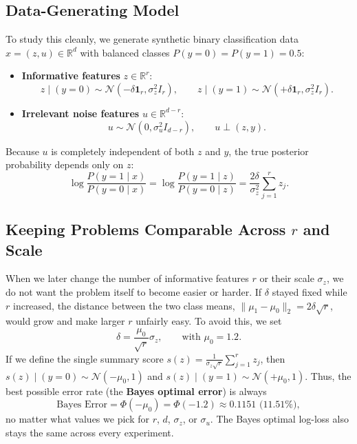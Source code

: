 \documentclass[11pt, a4paper]{article}
\begin{document}
\subsection{Data-Generating Model}
To study this cleanly, we generate synthetic binary classification data $x = (z, u) \in \mathbb{R}^d$ with balanced classes $P(y=0) = P(y=1) = 0.5$:
\begin{itemize}
    \item \textbf{Informative features} $z \in \mathbb{R}^r$:
    \[
        z \mid (y = 0) \sim \mathcal{N}(-\delta \mathbf{1}_r, \sigma_z^2 I_r), \qquad
        z \mid (y = 1) \sim \mathcal{N}(+\delta \mathbf{1}_r, \sigma_z^2 I_r).
    \]
    \item \textbf{Irrelevant noise features} $u \in \mathbb{R}^{d-r}$:
    \[
        u \sim \mathcal{N}(0, \sigma_u^2 I_{d-r}), \qquad u \perp (z, y).
    \]
\end{itemize}
Because $u$ is completely independent of both $z$ and $y$, the true posterior probability depends only on $z$:
\[
    \log \frac{P(y=1 \mid x)}{P(y=0 \mid x)}
    = \log \frac{P(y=1 \mid z)}{P(y=0 \mid z)}
    = \frac{2\delta}{\sigma_z^2} \sum_{j=1}^{r} z_j.
\]

\subsection{Keeping Problems Comparable Across $r$ and Scale}
When we later change the number of informative features $r$ or their scale $\sigma_z$, we do not want the problem itself to become easier or harder. If $\delta$ stayed fixed while $r$ increased, the distance between the two class means, $\|\mu_1 - \mu_0\|_2 = 2\delta\sqrt{r}$, would grow and make larger $r$ unfairly easy. To avoid this, we set
\[
    \delta = \frac{\mu_0}{\sqrt{r}} \sigma_z, \qquad \text{with } \mu_0 = 1.2.
\]
If we define the single summary score $s(z) = \frac{1}{\sigma_z \sqrt{r}} \sum_{j=1}^r z_j$, then $s(z) \mid (y=0) \sim \mathcal{N}(-\mu_0, 1)$ and $s(z) \mid (y=1) \sim \mathcal{N}(+\mu_0, 1)$. Thus, the best possible error rate (the \textbf{Bayes optimal error}) is always
\[
    \text{Bayes Error} = \Phi(-\mu_0) = \Phi(-1.2) \approx 0.1151 \text{ (11.51\%)},
\]
no matter what values we pick for $r$, $d$, $\sigma_z$, or $\sigma_u$. The Bayes optimal log-loss also stays the same across every experiment.
\end{document}
